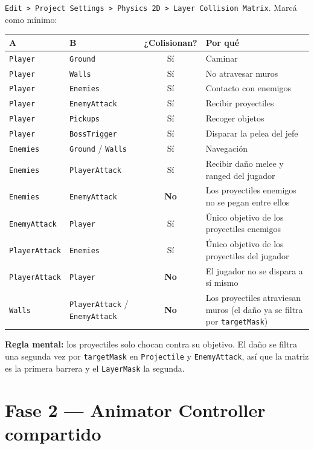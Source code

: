 \documentclass[a4paper,12pt]{article}
\newcommand{\code}[1]{\texttt{#1}}
\begin{document}
\code{Edit > Project Settings > Physics 2D > Layer Collision Matrix}. Marcá como mínimo:

\begin{center}
\begin{longtable}{|l|l|c|p{5.4cm}|}
\hline
\textbf{A} & \textbf{B} & \textbf{¿Colisionan?} & \textbf{Por qué} \\
\hline
\endhead
\code{Player} & \code{Ground} & Sí & Caminar \\
\hline
\code{Player} & \code{Walls} & Sí & No atravesar muros \\
\hline
\code{Player} & \code{Enemies} & Sí & Contacto con enemigos \\
\hline
\code{Player} & \code{EnemyAttack} & Sí & Recibir proyectiles \\
\hline
\code{Player} & \code{Pickups} & Sí & Recoger objetos \\
\hline
\code{Player} & \code{BossTrigger} & Sí & Disparar la pelea del jefe \\
\hline
\code{Enemies} & \code{Ground} / \code{Walls} & Sí & Navegación \\
\hline
\code{Enemies} & \code{PlayerAttack} & Sí & Recibir daño melee y ranged del jugador \\
\hline
\code{Enemies} & \code{EnemyAttack} & \textbf{No} & Los proyectiles enemigos no se pegan entre ellos \\
\hline
\code{EnemyAttack} & \code{Player} & Sí & Único objetivo de los proyectiles enemigos \\
\hline
\code{PlayerAttack} & \code{Enemies} & Sí & Único objetivo de los proyectiles del jugador \\
\hline
\code{PlayerAttack} & \code{Player} & \textbf{No} & El jugador no se dispara a sí mismo \\
\hline
\code{Walls} & \code{PlayerAttack} / \code{EnemyAttack} & \textbf{No} & Los proyectiles atraviesan muros (el daño ya se filtra por \code{targetMask}) \\
\hline
\end{longtable}
\end{center}

\textbf{Regla mental:} los proyectiles solo chocan contra su objetivo. El daño se filtra una
segunda vez por \code{targetMask} en \code{Projectile} y \code{EnemyAttack}, así que la matriz
es la primera barrera y el \code{LayerMask} la segunda.

\section{Fase 2 --- Animator Controller compartido}
\end{document}
